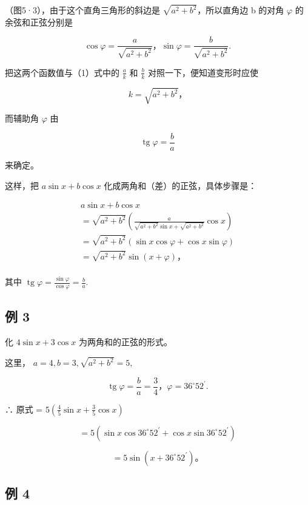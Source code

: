 （图5·3），由于这个直角三角形的斜边是
\(\sqrt{a^{2}+b^{2}}\)，所以直角边 b 的对角 \(\varphi\)
的余弦和正弦分别是

\[
\cos \varphi = \frac {a}{\sqrt {a ^ {2} + b ^ {2}}}\text{，} \sin \varphi = \frac {b}{\sqrt {a ^ {2} + b ^ {2}}}.
\]

把这两个函数值与（1）式中的 \(\frac{a}{k}\) 和 \(\frac{b}{k}\)
对照一下，便知道变形时应使

\[
k = \sqrt {a ^ {2} + b ^ {2}}\text{，}
\]

而辅助角 \(\varphi\) 由

\[
\operatorname{tg} \varphi = \frac {b}{a}
\]

来确定。

这样，把 \(a\sin x + b\cos x\) 化成两角和（差）的正弦，具体步骤是：

\[
\begin{array}{l} a \sin x + b \cos x \\ = \sqrt {a ^ {2} + b ^ {2}} \left(\frac {a}{\sqrt {a ^ {2} + b ^ {2}} \sin x + \sqrt {a ^ {2} + b ^ {2}}} \cos x\right) \\ = \sqrt {a ^ {2} + b ^ {2}} (\sin x \cos \varphi + \cos x \sin \varphi) \\ = \sqrt {a ^ {2} + b ^ {2}} \sin (x + \varphi)\text{，} \\ \end{array}
\]

其中
\(\operatorname{tg} \varphi = \frac{\sin \varphi}{\cos \varphi} = \frac{b}{a}\).

\subsection{例 3}

化 \(4 \sin x + 3 \cos x\) 为两角和的正弦的形式。

 这里， \(a = 4, b = 3, \sqrt{a^2 + b^2} = 5,\)

\[
\operatorname{tg} \varphi = \frac {b}{a} = \frac {3}{4}\text{，} \varphi = 36 ^{\circ} 52 ^{\prime}.
\]

∴ 原式 = \(5\left(\frac{4}{5}\sin x + \frac{3}{5}\cos x\right)\)

\[
= 5 (\sin x \cos 36 ^{\circ} 52 ^{\prime} + \cos x \sin 36 ^{\circ} 52 ^{\prime})
\]

\[
= 5 \sin (x + 36 ^{\circ} 52 ^{\prime})\text{。}
\]

\subsection{例 4}

